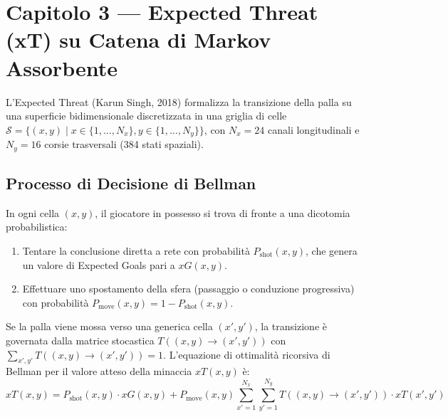 \documentclass[11pt,a4paper]{article}
\begin{document}
\section{Capitolo 3 — Expected Threat (xT) su Catena di Markov Assorbente}

L'Expected Threat (Karun Singh, 2018) formalizza la transizione della palla su una superficie bidimensionale discretizzata in una griglia di celle $\mathcal{S} = \{ (x, y) \mid x \in \{1, \dots, N_x\}, y \in \{1, \dots, N_y\} \}$, con $N_x = 24$ canali longitudinali e $N_y = 16$ corsie trasversali (384 stati spaziali).

\subsection{Processo di Decisione di Bellman}
In ogni cella $(x, y)$, il giocatore in possesso si trova di fronte a una dicotomia probabilistica:
\begin{enumerate}
    \item Tentare la conclusione diretta a rete con probabilità $P_{\text{shot}}(x, y)$, che genera un valore di Expected Goals pari a $xG(x, y)$.
    \item Effettuare uno spostamento della sfera (passaggio o conduzione progressiva) con probabilità $P_{\text{move}}(x, y) = 1 - P_{\text{shot}}(x, y)$.
\end{enumerate}
Se la palla viene mossa verso una generica cella $(x', y')$, la transizione è governata dalla matrice stocastica $T((x, y) \to (x', y'))$ con $\sum_{x', y'} T((x, y) \to (x', y')) = 1$. L'equazione di ottimalità ricorsiva di Bellman per il valore atteso della minaccia $xT(x, y)$ è:
\begin{equation}
xT(x, y) = P_{\text{shot}}(x, y) \cdot xG(x, y) + P_{\text{move}}(x, y) \sum_{x'=1}^{N_x} \sum_{y'=1}^{N_y} T((x, y) \to (x', y')) \cdot xT(x', y')
\end{equation}
\end{document}

